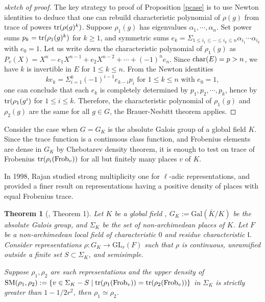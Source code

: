 \documentclass[20pt, oneside]{article}   	%
\newtheorem{thm}{Theorem}[section]
\theoremstyle{definition}
\newcommand{\fl}{\mathfrak{l}}
\newcommand{\Gal}{\mathrm{Gal}}
\newcommand{\GL}{\mathrm{GL}}
\begin{document}
\begin{proof}[sketch of proof]
The key strategy to proof of Proposition \ref{pcase}  is to use Newton identities to deduce that one can rebuild characteristic polynomial of $\rho(g)$ from trace of  powers ${\rm tr}(\rho(g)^k)$. Suppose $\rho_1(g)$ has eigenvalues $\alpha_1,\cdots,\alpha_n$. Set power sums $p_k={\rm tr}(\rho_1(g)^k)$ for $k\geqslant 1$, and symmetric sums $e_k=\Sigma_{1\leqslant i_1\leqslant\cdots\leqslant i_k\leqslant n}\alpha_{i_1}\cdots \alpha_{i_k}$ with $e_0=1$. Let us write down the characteristic polynomial of $\rho_1(g)$ as $P_v(X)=X^n-e_1X^{n-1}+e_2X^{n-2}+\cdots+(-1)^ne_n$.
Since ${\rm char}(E)=p>n$, we have $k$ is invertible in $E$ for $1\leqslant k\leqslant n$. From the Newton identities $$ke_k=\Sigma_{i=1}^k(-1)^{i-1}e_{k-i}p_i \textrm{ for $1\leqslant k\leqslant n$ with $e_0=1$},$$ one can conclude that each $e_k$ is completely determined by $p_1, p_2,\cdots, p_k$, hence by ${\rm tr}(\rho_1(g^i)$ for $1\leqslant i\leqslant k$. Therefore, the characteristic polynomial of $\rho_1(g)$ and $\rho_2(g)$ are the same for all $g\in G$, the Brauer-Nesbitt theorem applies.
\end{proof}

Consider the case when $G=G_K$ is the absolute Galois group of a global field $K$. Since the trace function is a continuous class function, and Frobenius elements are dense in $G_K$ by Chebotarev density theorem, it is enough to test on trace of Frobenius ${\rm tr}(\rho_i({\rm Frob}_v))$ for all but finitely many places $v$ of $K$.



In 1998, Rajan studied strong multiplicity one for $\ell$-adic representations, and provided a finer result on representations having a positive density of places with equal Frobenius trace.  

\begin{thm}[\cite{Ra98}, Theorem 1] \label{Ra1}
Let $K$ be a global field , $G_K:=\Gal(\bar{K}/K)$ be the absolute Galois group, and $\Sigma_K$ be the set of non-archimedean places of $K$. Let $F$ be a non-archimedean local field of characteristic $0$ and residue characteristic $\fl$. Consider representations $\rho: G_K\rightarrow \GL_r(F)$ such that $\rho$ is continuous, unramified outside a finite set $S\subset\Sigma_K$, and semisimple.

 Suppose $\rho_1, \rho_2$ are such representations and the upper density of ${\rm SM}(\rho_1,\rho_2):=\{v\in\Sigma_K-S\mid {\rm tr}(\rho_1({\rm Frob}_v))={\rm tr}(\rho_2({\rm Frob}_v))\}$ in $\Sigma_K$ is strictly greater than $1-1/2r^2$, then $\rho_1\simeq\rho_2$.

\end{thm}
\end{document}
